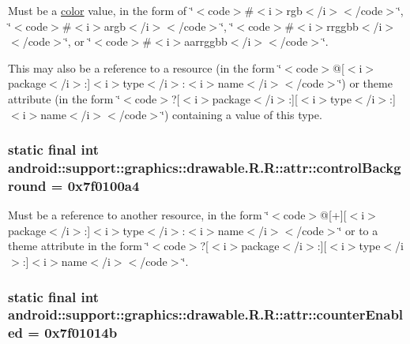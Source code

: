 Must be a \hyperlink{classandroid_1_1support_1_1graphics_1_1drawable_1_1_r_1_1color}{color} value, in the form of \char`\"{}$<$code$>$\#$<$i$>$rgb$<$/i$>$$<$/code$>$\char`\"{}, \char`\"{}$<$code$>$\#$<$i$>$argb$<$/i$>$$<$/code$>$\char`\"{}, \char`\"{}$<$code$>$\#$<$i$>$rrggbb$<$/i$>$$<$/code$>$\char`\"{}, or \char`\"{}$<$code$>$\#$<$i$>$aarrggbb$<$/i$>$$<$/code$>$\char`\"{}. 

This may also be a reference to a resource (in the form \char`\"{}$<$code$>$@\mbox{[}$<$i$>$package$<$/i$>$:\mbox{]}$<$i$>$type$<$/i$>$:$<$i$>$name$<$/i$>$$<$/code$>$\char`\"{}) or theme attribute (in the form \char`\"{}$<$code$>$?\mbox{[}$<$i$>$package$<$/i$>$:\mbox{]}\mbox{[}$<$i$>$type$<$/i$>$:\mbox{]}$<$i$>$name$<$/i$>$$<$/code$>$\char`\"{}) containing a value of this type. \hypertarget{classandroid_1_1support_1_1graphics_1_1drawable_1_1_r_1_1attr_b825e05e961f0b282d26ca6623d1f1a1}{
\subsubsection[{controlBackground}]{\setlength{\rightskip}{0pt plus 5cm}static final int android::support::graphics::drawable.R.R::attr::controlBackground = 0x7f0100a4}}
\label{classandroid_1_1support_1_1graphics_1_1drawable_1_1_r_1_1attr_b825e05e961f0b282d26ca6623d1f1a1}


Must be a reference to another resource, in the form \char`\"{}$<$code$>$@\mbox{[}+\mbox{]}\mbox{[}$<$i$>$package$<$/i$>$:\mbox{]}$<$i$>$type$<$/i$>$:$<$i$>$name$<$/i$>$$<$/code$>$\char`\"{} or to a theme attribute in the form \char`\"{}$<$code$>$?\mbox{[}$<$i$>$package$<$/i$>$:\mbox{]}\mbox{[}$<$i$>$type$<$/i$>$:\mbox{]}$<$i$>$name$<$/i$>$$<$/code$>$\char`\"{}. \hypertarget{classandroid_1_1support_1_1graphics_1_1drawable_1_1_r_1_1attr_56e986da4e516ba90edc31787b70460c}{
\subsubsection[{counterEnabled}]{\setlength{\rightskip}{0pt plus 5cm}static final int android::support::graphics::drawable.R.R::attr::counterEnabled = 0x7f01014b}}
\label{classandroid_1_1support_1_1graphics_1_1drawable_1_1_r_1_1attr_56e986da4e516ba90edc31787b70460c}


